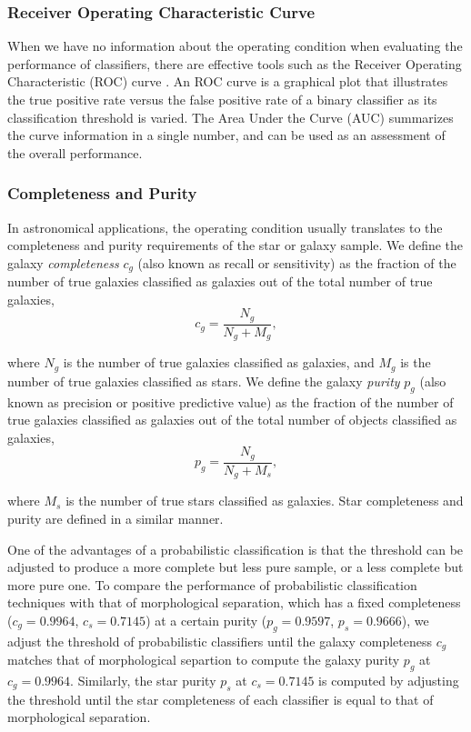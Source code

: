 \documentclass[useAMS,usenatbib]{mn2e}
\begin{document}
\subsubsection{Receiver Operating Characteristic Curve}

When we have no information about the operating condition
when evaluating the performance of classifiers,
there are effective tools such as
the Receiver Operating Characteristic (ROC) curve
\citep*{swets2000better}.
An ROC curve is a graphical plot that illustrates the true positive rate
versus the false positive rate of a binary classifier
as its classification threshold is varied.
The Area Under the Curve (AUC) summarizes the curve information
in a single number,
and can be used as an assessment of the overall performance.

\subsubsection{Completeness and Purity}

In astronomical applications,
the operating condition usually translates to
the completeness and purity requirements of the star or galaxy sample.
We define the galaxy \textit{completeness}
$c_g$ (also known as recall or sensitivity) as
the fraction of the number of true galaxies classified as galaxies
out of the total number of true galaxies,
\begin{equation}
c_g = \frac{N_g}{N_g + M_g},
\end{equation}

\noindent
where $N_g$ is the number of true galaxies classified as galaxies,
and $M_g$ is the number of true galaxies classified as stars.
We define the galaxy \textit{purity} $p_g$ (also known as precision
or positive predictive value)
as the fraction of the number of true galaxies classified as galaxies
out of the total number of objects classified as galaxies, 
\begin{equation}
p_g = \frac{N_g}{N_g + M_s},
\end{equation}

\noindent
where $M_s$ is the number of true stars classified as galaxies.
Star completeness and purity are defined in a similar manner.


One of the advantages of a probabilistic classification is
that the threshold can be adjusted to produce
a more complete but less pure sample,
or a less complete but more pure one.
To compare the performance of probabilistic classification techniques
with that of morphological separation,
which has a fixed completeness ($c_g = 0.9964$, $c_s = 0.7145$)
at a certain purity ($p_g = 0.9597$, $p_s = 0.9666$),
we adjust the threshold of probabilistic classifiers
until the galaxy completeness $c_g$ matches
that of morphological separtion
to compute the galaxy purity $p_{g}$ at $c_g=0.9964$.
Similarly, the star purity $p_{s}$ at $c_{s}=0.7145$
is computed by adjusting the threshold
until the star completeness of each classifier is equal to
that of morphological separation.
\end{document}
